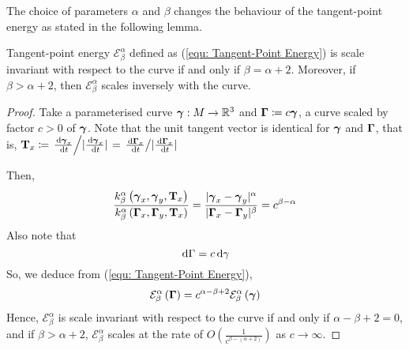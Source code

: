 \documentclass[../dissertation.tex]{subfiles}
\begin{document}
The choice of parameters $\alpha$ and $\beta$ changes the behaviour of the tangent-point energy as stated in the following lemma.
\begin{lemma}
    Tangent-point energy $\mathcal{E}_{\beta}^{\alpha}$ defined as (\ref{equ: Tangent-Point Energy}) is scale invariant with respect to the curve if and only if $\beta = \alpha + 2$.
    Moreover, if $\beta > \alpha + 2$, then $\mathcal{E}_{\beta}^{\alpha}$ scales inversely with the curve.
\end{lemma}
\begin{proof}
    Take a parameterised curve $\boldsymbol{\gamma}:M \rightarrow \mathbb{R}^3$ and $\boldsymbol{\Gamma} \coloneqq c \boldsymbol{\gamma}$, a curve scaled by factor $c>0$ of $\boldsymbol{\gamma}$.
    Note that the unit tangent vector is identical for $\boldsymbol{\gamma}$ and $\boldsymbol{\Gamma}$, that is, $\mathbf{T}_x \coloneqq \left. \frac{\, \text{d} \boldsymbol{\gamma}_x}{\, \text{d} t} \middle/ \lvert\frac{\, \text{d} \boldsymbol{\gamma}_x}{\, \text{d} t}\lvert \right. = \left. \frac{\, \text{d} \boldsymbol{\Gamma}_x}{\, \text{d} t} \middle/ \lvert\frac{\, \text{d} \boldsymbol{\Gamma}_x}{\, \text{d} t}\lvert \right. $

    Then,
    \begin{equation}
        \frac{k_{\beta}^{\alpha} \left( \boldsymbol{\gamma}_x, \boldsymbol{\gamma}_y, \mathbf{T}_x \right)}{k_{\beta}^{\alpha} \left( \boldsymbol{\Gamma}_x, \boldsymbol{\Gamma}_y, \mathbf{T}_x \right)}
        =
        \frac{\lvert\boldsymbol{\gamma}_x - \boldsymbol{\gamma}_y\lvert^{\alpha}}{\lvert\boldsymbol{\Gamma}_x - \boldsymbol{\Gamma}_y\lvert^{\beta}} = c^{\beta - \alpha}
    \end{equation}
    Also note that
    \begin{equation}
        \, \text{d} \Gamma = c \, \text{d} \gamma
    \end{equation}
    So, we deduce from (\ref{equ: Tangent-Point Energy}),
    \begin{equation}
        \mathcal{E}_{\beta}^{\alpha} \left( \boldsymbol{\Gamma} \right) = c^{\alpha - \beta + 2} \mathcal{E}_{\beta}^{\alpha} \left( \boldsymbol{\gamma} \right)
    \end{equation}
    Hence, $\mathcal{E}_{\beta}^{\alpha}$ is scale invariant with respect to the curve if and only if $\alpha - \beta + 2 = 0$, and if $\beta > \alpha + 2$, $\mathcal{E}_{\beta}^{\alpha}$ scales at the rate of $O\left( \frac{1}{c^{\beta - \left( \alpha + 2 \right)}} \right)$ as $c \rightarrow \infty$.
\end{proof}
\end{document}
